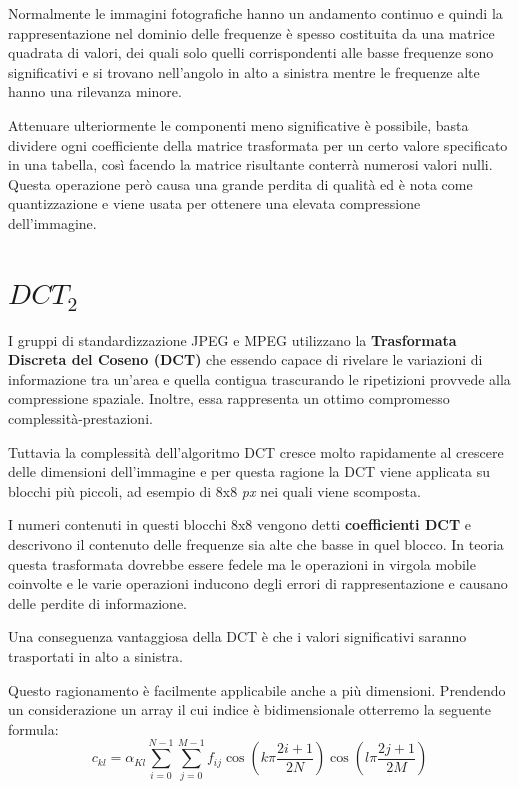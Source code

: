 \documentclass[a4paper,12pt,titlepage,oneside]{book}
\begin{document}
Normalmente le immagini fotografiche hanno un andamento continuo e quindi la rappresentazione nel dominio delle frequenze  è spesso costituita da una matrice quadrata di valori, dei quali solo quelli corrispondenti alle basse frequenze sono significativi e si trovano nell'angolo in alto a sinistra mentre le frequenze alte hanno una rilevanza minore.

Attenuare ulteriormente le componenti meno significative è possibile, basta dividere ogni coefficiente della matrice trasformata per un certo valore specificato in una tabella, così facendo la matrice risultante conterrà numerosi valori nulli. Questa operazione però causa una grande perdita di qualità ed è nota come quantizzazione e viene usata per ottenere una elevata compressione dell'immagine.

\section{$DCT_2$}
I gruppi di standardizzazione JPEG e MPEG utilizzano la \textbf{Trasformata Discreta del Coseno (DCT)} che essendo capace di rivelare le variazioni di informazione tra un’area e quella contigua trascurando le ripetizioni provvede alla compressione spaziale. Inoltre, essa rappresenta un ottimo compromesso complessità-prestazioni.

Tuttavia la complessità dell'algoritmo DCT cresce molto rapidamente al crescere delle dimensioni dell'immagine e per questa ragione la DCT viene applicata su blocchi più piccoli, ad esempio di 8x8 \textit{px} nei quali viene scomposta.

I numeri contenuti in questi blocchi 8x8 vengono detti \textbf{coefficienti DCT} e descrivono il contenuto delle frequenze sia alte che basse in quel blocco. In teoria questa trasformata dovrebbe essere fedele ma le operazioni in virgola mobile coinvolte e le varie operazioni inducono degli errori di rappresentazione e causano delle perdite di informazione.

Una conseguenza vantaggiosa della DCT è che i valori significativi saranno trasportati in alto a sinistra.

Questo ragionamento è facilmente applicabile anche a più dimensioni. Prendendo un considerazione un array il cui indice è bidimensionale otterremo la seguente formula:
\begin{equation}
    c_{kl} = \alpha_{Kl} \sum^{N-1}_{i=0} \sum^{M-1}_{j=0} f_{ij} \cos ( k \pi \frac{2i + 1}{2N} ) \cos (l \pi \frac{2j + 1}{2M})
\end{equation}
\end{document}
